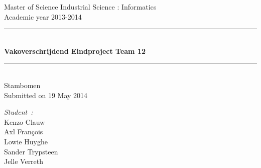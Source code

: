 \documentclass[pdftex,a4paper,12pt,twoside]{report}
\newcommand{\HRule}{\rule{\linewidth}{0.5mm}}
\newcommand{\emptypage}
{
	\newpage
	\thispagestyle{empty}
	\mbox{}
	\newpage
}
\newcommand{\studenta}{Kenzo Clauw}
\newcommand{\studentb}{Axl Fran\c{c}ois}
\newcommand{\studentc}{Lowie Huyghe}
\newcommand{\studentd}{Sander Trypsteen}
\newcommand{\studente}{Jelle Verreth}
\newcommand{\titel}{Vakoverschrijdend Eindproject Team 12}
\newcommand{\ondertitel}{Stambomen}
\newcommand{\datum}{19 May 2014}
\newcommand{\academiejaar}{2013-2014}
\begin{document}
\emptypage


\begin{titlepage}
\begin{center}
Master of Science Industrial Science : Informatics\\
Academic year \academiejaar

\vfill

\HRule \\[0.4cm]
{ \huge \bfseries \titel}\\[0.4cm]
\HRule \\[0.4cm]

{\Large \ondertitel}\\[0.4cm]

Submitted on \datum

\vfill

\begin{minipage}{0.49\textwidth}
\begin{flushleft}
\emph{Student\ifdefined\ \fi :}\\
\studenta \\
\studentb \\
\studentc \\
\studentd \\
\studente
\end{flushleft}
\end{minipage}
\begin{minipage}{0.49\textwidth}
\begin{flushright}
\end{flushright}
\end{minipage}

\end{center}

\end{titlepage}
\end{document}
